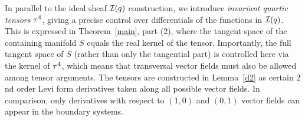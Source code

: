 \documentclass[12pt]{amsart}
\begin{document}
%

%




%

In parallel to the ideal sheaf ${\mathcal{I}}(q)$ construction,
we introduce {\em invariant quartic tensors} $\tau^4$,
giving a precise control over differentials of
the functions in ${\mathcal{I}}(q)$.
This is expressed in Theorem~\ref{main}, part (2),
where the tangent space of the containing manifold $S$
equals the real kernel of the tensor.
Importantly, the full tangent space of $S$
(rather than only the tangential part) is controlled here
via the kernel of $\tau^4$, which means that transversal vector fields
must also be allowed among tensor arguments.
The tensors are constructed in Lemma~\ref{d2}
as certain $2$nd order Levi form derivatives
taken along all possible vector fields.
In comparison, only derivatives with 
respect to $(1,0)$ and $(0,1)$ vector fields
can appear in the boundary systems.
%
%
%
%
\end{document}
